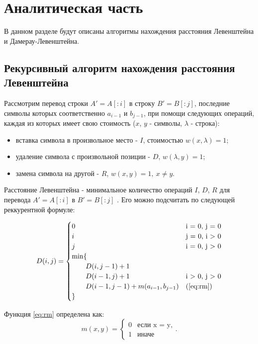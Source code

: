 \chapter{Аналитическая часть}

В данном разделе будут описаны алгоритмы нахождения расстояния Левенштейна и Дамерау-Левенштейна.

\section{Рекурсивный алгоритм нахождения расстояния Левенштейна}

Рассмотрим перевод строки $A'= A[:i]$ в строку $B' = B[:j]$, последние символы которых соответственно $a_{i-1}$ и $b_{j-1}$, при помощи следующих операций, каждая из которых имеет свою стоимость ($x$, $y$ - символы, $\lambda$ - строка):

\begin{itemize}
	\item вставка символа в произвольное место - $I$, стоимостью $w(x,\lambda)=1$;
	\item удаление символа с произвольной позиции - $D$, $w(\lambda,y)=1$;
	\item замена символа на другой - $R$, $w(x,y)=1, \medspace x \neq y$.
\end{itemize}

Расстояние Левенштейна - минимальное количество операций $I$, $D$, $R$ для перевода $A'= A[:i]$ в $B' = B[:j]$ \cite{foxford}. Его можно подсчитать по следующей реккурентной формуле:

\begin{equation}
	\label{eq:rL}
	D(i, j) = \begin{cases}
		0 &\text{i = 0, j = 0}\\
		i &\text{j = 0, i > 0}\\
		j &\text{i = 0, j > 0}\\
		\min \lbrace \\
		\qquad D(i, j-1) + 1\\
		\qquad D(i-1, j) + 1 &\text{i > 0, j > 0}\\
		\qquad D(i-1, j-1) + m(a_{i-1}, b_{j-1}) &\text(\ref{eq:rm})\\
		\rbrace
	\end{cases}
\end{equation}

Функция \ref{eq:rm} определена как:
\begin{equation}
	\label{eq:rm}
	m(x, y) = \begin{cases}
		0 &\text{если x = y,}\\
		1 &\text{иначе}
	\end{cases}.
\end{equation}

